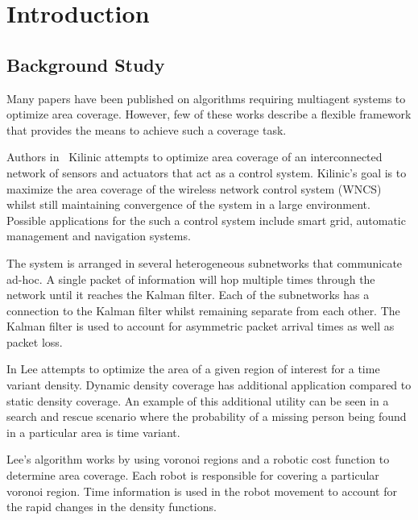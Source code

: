 \chapter{Introduction}
\label{sec:introductionAreaCoverageOptimization}


\section{Background Study} %
Many papers have been published on algorithms requiring multi\-agent systems to optimize area coverage. However, few of these works describe a flexible framework that provides the means to achieve such a coverage task. 

Authors in~\cite{Kilinc2015} Kilinic attempts to optimize area coverage of an interconnected network of sensors and actuators that act as a control system. Kilinic’s goal is to maximize the area coverage of the wireless network control system (WNCS) whilst still maintaining convergence of the system in a large environment. Possible applications for the such a control system include smart grid, automatic management and navigation systems.  

The system is arranged in several heterogeneous subnetworks that communicate ad-hoc.  A single packet of information will hop multiple times through the network until it reaches the Kalman filter. Each of the subnetworks has a connection to the Kalman filter whilst remaining separate from each other. The Kalman filter is used to account for asymmetric packet arrival times as well as packet loss.  

In \cite{Lee2015} Lee attempts to optimize the area of a given region of interest for a time variant density. Dynamic density coverage has additional application compared to static density coverage. An example of this additional utility can be seen in a search and rescue scenario where the probability of a missing person being found in a particular area is time variant. 

Lee’s algorithm works by using voronoi regions and a robotic cost function to determine area coverage. Each robot is responsible for covering a particular voronoi region. Time information is used in the robot movement to account for the rapid changes in the density functions. 

